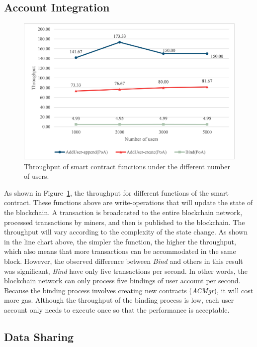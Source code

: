 \subsection*{Account Integration}
\begin{figure}[htb]
    \centering
    \includegraphics[height=!,width=1\linewidth,keepaspectratio=true]{figures/smart_contract_tps.png}
    \caption{{\footnotesize Throughput of smart contract functions under the different number of users.}}
    \label{fig:contract_tps}
\end{figure}
As shown in Figure~\ref{fig:contract_tps}, the throughput for different functions of the smart contract. These functions above are write-operations that will update the state of the blockchain. A transaction is broadcasted to the entire blockchain network, processed transactions by miners, and then is published to the blockchain. The throughput will vary according to the complexity of the state change. As shown in the line chart above, the simpler the function, the higher the throughput, which also means that more transactions can be accommodated in the same block. However, the observed difference between \textit{Bind} and others in this result was significant, \textit{Bind} have only five transactions per second. In other words, the blockchain network can only process five bindings of user account per second. Because the binding process involves creating new contracts (\textit{ACMgr}), it will cost more gas. Although the throughput of the binding process is low, each user account only needs to execute once so that the performance is acceptable.

\newpage

\subsection*{Data Sharing}

